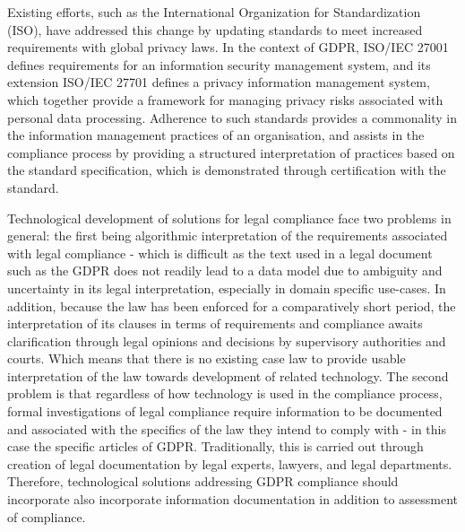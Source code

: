 Existing efforts, such as the International Organization for Standardization (ISO), have addressed this change by updating standards to meet increased requirements with global privacy laws.
In the context of GDPR, ISO/IEC 27001 defines requirements for an information security management system, and its extension ISO/IEC 27701 defines a privacy information management system, which together provide a framework for managing privacy risks associated with personal data processing.
Adherence to such standards provides a commonality in the information management practices of an organisation, and assists in the compliance process by providing a structured interpretation of practices based on the standard specification, which is demonstrated through certification with the standard.

Technological development of solutions for legal compliance face two problems in general: the first being algorithmic interpretation of the requirements associated with legal compliance - which is difficult as the text used in a legal document such as the GDPR does not readily lead to a data model due to ambiguity and uncertainty in its legal interpretation, especially in domain specific use-cases.
In addition, because the law has been enforced for a comparatively short period, the interpretation of its clauses in terms of requirements and compliance awaits clarification through legal opinions and decisions by supervisory authorities and courts.
Which means that there is no existing case law to provide usable interpretation of the law towards development of related technology.
The second problem is that regardless of how technology is used in the compliance process, formal investigations of legal compliance require information to be documented and associated with the specifics of the law they intend to comply with - in this case the specific articles of GDPR.
Traditionally, this is carried out through creation of legal documentation by legal experts, lawyers, and legal departments.
Therefore, technological solutions addressing GDPR compliance should incorporate also incorporate information documentation in addition to assessment of compliance. 

